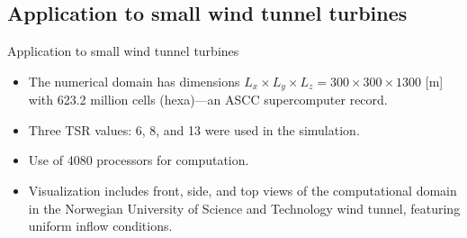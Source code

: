 \documentclass[10pt]{beamer}
\begin{document}
\subsection{Application to small wind tunnel turbines}

\begin{frame}{Application to small wind tunnel turbines}

\begin{itemize}
\item[\large\ding{113}] The numerical domain has dimensions $L_x \times L_y \times L_z = 300 \times 300 \times 1300$ [m] with 623.2 million cells (hexa)—an ASCC supercomputer record.
\item[\large\ding{113}] Three TSR values: 6, 8, and 13 were used in the simulation.
\item[\large\ding{113}] Use of 4080 processors for computation.
\item[\large\ding{113}] Visualization includes front, side, and top views of the computational domain in the Norwegian University of Science and Technology wind tunnel, featuring uniform inflow conditions.
\end{itemize}


\begin{figure}
\centering
{}
\end{figure}
\end{frame}
\end{document}

